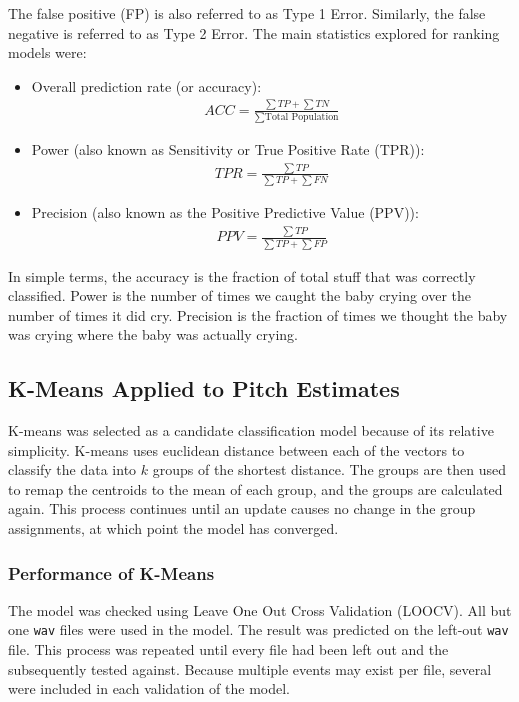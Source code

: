 \documentclass[paper=a4, fontsize=11pt]{scrartcl}
\numberwithin{equation}{section}
\numberwithin{figure}{section}
\numberwithin{table}{section}
\begin{document}
The false positive (FP) is also referred to as Type 1 Error. Similarly, the false negative is referred to as Type 2 Error. The main statistics explored for ranking models were:\\
\begin{itemize}
\item Overall prediction rate (or accuracy):
\begin{align*}
ACC = \frac{\sum TP + \sum TN}{\sum \text{Total Population}}
\end{align*}
\item Power (also known as Sensitivity or True Positive Rate (TPR)):
\begin{align*}
TPR = \frac{\sum TP}{\sum TP + \sum FN}
\end{align*}
\item Precision (also known as the Positive Predictive Value (PPV)):
\begin{align*}
PPV = \frac{\sum TP}{\sum TP + \sum FP}
\end{align*}
\end{itemize}

In simple terms, the accuracy is the fraction of total stuff that was correctly classified. Power is the number of times we caught the baby crying over the number of times it did cry. Precision is the fraction of times we thought the baby was crying where the baby was actually crying.

\subsection{K-Means Applied to Pitch Estimates}
K-means was selected as a candidate classification model because of its relative simplicity. K-means uses euclidean distance between each of the vectors to classify the data into $k$ groups of the shortest distance. The groups are then used to remap the centroids to the mean of each group, and the groups are calculated again. This process continues until an update causes no change in the group assignments, at which point the model has converged.


\subsubsection{Performance of K-Means}\label{subsubsec:LOOCV}
The model was checked using Leave One Out Cross Validation (LOOCV). All but one \texttt{wav} files were used in the model. The result was predicted on the left-out \texttt{wav} file. This process was repeated until every file had been left out and the subsequently tested against. Because multiple events may exist per file, several were included in each validation of the model.
\end{document}
